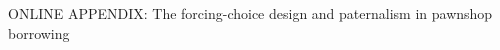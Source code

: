 
\setcounter{table}{0}
\setcounter{figure}{0}
\setcounter{section}{0}
\renewcommand\thefigure{OA-\arabic{figure}}
\renewcommand\thetable{OA-\arabic{table}}
\renewcommand*{\thepage}{OA - \arabic{page}}
\renewcommand\thesection{Appendix \Alph{section}.}
\renewcommand\thesubsection{\Alph{section}.\arabic{subsection}}

\begin{center}
	\Large ONLINE APPENDIX: The forcing-choice design and paternalism in pawnshop borrowing \\[0.5em]
	\large \author{Francis J.\ DiTraglia \and Craig McIntosh \and Isaac Meza \and Joyce Sadka \and Enrique Seira}
\end{center}


